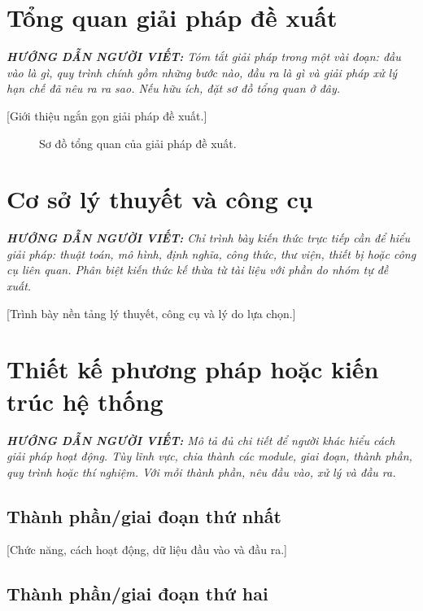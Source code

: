 \documentclass[12pt,a4paper]{report}
\newcommand{\huongdan}[1]{%
  \par\smallskip\noindent
  \textit{\textbf{HƯỚNG DẪN NGƯỜI VIẾT:} #1}%
  \par\smallskip}
\begin{document}
\section{Tổng quan giải pháp đề xuất}

\huongdan{Tóm tắt giải pháp trong một vài đoạn: đầu vào là gì, quy trình chính
gồm những bước nào, đầu ra là gì và giải pháp xử lý hạn chế đã nêu ra ra sao.
Nếu hữu ích, đặt sơ đồ tổng quan ở đây.}

[Giới thiệu ngắn gọn giải pháp đề xuất.]

\begin{figure}[H]
  \centering
  \caption{Sơ đồ tổng quan của giải pháp đề xuất.}
  \label{fig:overview}
\end{figure}

\section{Cơ sở lý thuyết và công cụ}

\huongdan{Chỉ trình bày kiến thức trực tiếp cần để hiểu giải pháp: thuật toán,
mô hình, định nghĩa, công thức, thư viện, thiết bị hoặc công cụ liên quan.
Phân biệt kiến thức kế thừa từ tài liệu với phần do nhóm tự đề xuất.}

[Trình bày nền tảng lý thuyết, công cụ và lý do lựa chọn.]

\section{Thiết kế phương pháp hoặc kiến trúc hệ thống}

\huongdan{Mô tả đủ chi tiết để người khác hiểu cách giải pháp hoạt động.
Tùy lĩnh vực, chia thành các module, giai đoạn, thành phần, quy trình hoặc
thí nghiệm. Với mỗi thành phần, nêu đầu vào, xử lý và đầu ra.}

\subsection{Thành phần/giai đoạn thứ nhất}

[Chức năng, cách hoạt động, dữ liệu đầu vào và đầu ra.]

\subsection{Thành phần/giai đoạn thứ hai}
\end{document}
